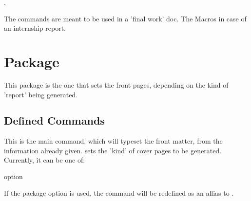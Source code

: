 \documentclass[article,nofontwarning,nogeometry,english,tocdepth=3,secdepth=3]{ufrgscca} %
\begin{document}
\begin{codedescribe}{\supervisor,\supervisorinfo}%
\begin{codesyntax}
\end{codesyntax}
\end{codedescribe}

\begin{tsremark}[N.B.:]
The commands \tsobj{\advisor,\coadvisor,\examiner,\altexaminer} are meant to be used in a 'final work' doc. The Macros \tsobj{\internship,\tutor,\supervisor} in case of an internship report.
\end{tsremark}


\section{ Package}
This package is the one that sets the front pages, depending on the kind of 'report' being generated. 


\subsection{Defined Commands}
\begin{codedescribe}[code,new=2023/11/18]{\MakeCoverPages}
	\begin{codesyntax}%
	\end{codesyntax}
This is the main command, which will typeset the front matter, from the information already given.  sets the 'kind' of cover pages to be generated. Currently, it can be one of:
\end{codedescribe}
\begin{describelist}{option}
\end{describelist}
\begin{tsremark}[N.B.:]
 If the package option  is used, the command \tsobj{\maketitle} will be redefined as an allias to \tsobj{\MakeCoverPages}.
\end{tsremark}
\end{document}
